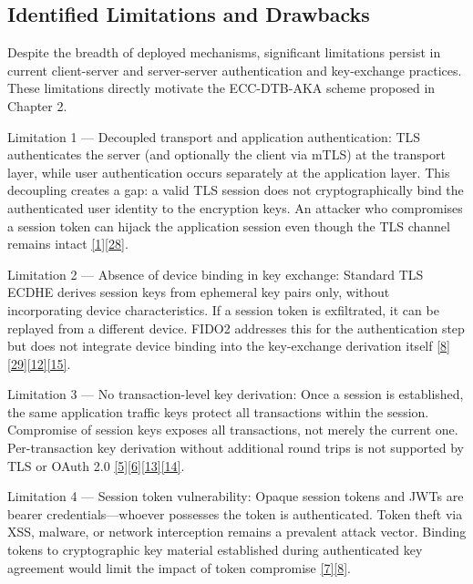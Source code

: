 \subsection{Identified Limitations and Drawbacks}

\indent Despite the breadth of deployed mechanisms, significant limitations persist in current client-server and server-server authentication and key-exchange practices. These limitations directly motivate the ECC-DTB-AKA scheme proposed in Chapter 2.

\indent Limitation 1 --- Decoupled transport and application authentication: TLS authenticates the server (and optionally the client via mTLS) at the transport layer, while user authentication occurs separately at the application layer. This decoupling creates a gap: a valid TLS session does not cryptographically bind the authenticated user identity to the encryption keys. An attacker who compromises a session token can hijack the application session even though the TLS channel remains intact \hyperref[ref:1]{[1]}\hyperref[ref:28]{[28]}.

\indent Limitation 2 --- Absence of device binding in key exchange: Standard TLS ECDHE derives session keys from ephemeral key pairs only, without incorporating device characteristics. If a session token is exfiltrated, it can be replayed from a different device. FIDO2 addresses this for the authentication step but does not integrate device binding into the key-exchange derivation itself \hyperref[ref:8]{[8]}\hyperref[ref:29]{[29]}\hyperref[ref:12]{[12]}\hyperref[ref:15]{[15]}.

\indent Limitation 3 --- No transaction-level key derivation: Once a session is established, the same application traffic keys protect all transactions within the session. Compromise of session keys exposes all transactions, not merely the current one. Per-transaction key derivation without additional round trips is not supported by TLS or OAuth 2.0 \hyperref[ref:5]{[5]}\hyperref[ref:6]{[6]}\hyperref[ref:13]{[13]}\hyperref[ref:14]{[14]}.

\indent Limitation 4 --- Session token vulnerability: Opaque session tokens and JWTs are bearer credentials---whoever possesses the token is authenticated. Token theft via XSS, malware, or network interception remains a prevalent attack vector. Binding tokens to cryptographic key material established during authenticated key agreement would limit the impact of token compromise \hyperref[ref:7]{[7]}\hyperref[ref:8]{[8]}.

